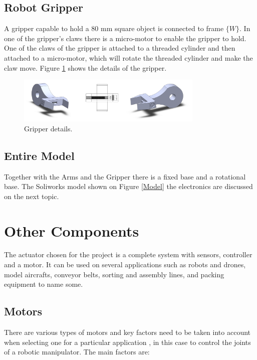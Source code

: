 \documentclass[transmag]{IEEEtran}
\begin{document}
\subsection{Robot Gripper}
A gripper capable to hold a 80 mm square object is connected to frame $\{W\}$.
In one of the gripper's claws there is a micro-motor to enable the gripper to hold.
One of the claws of the gripper is attached to a threaded cylinder and then attached to a micro-motor, which will rotate the threaded cylinder and make the claw move. Figure \ref{Gripper} shows the details of the gripper.

\begin{figure}
\centerline{\includegraphics[width=3.5in]{./images/Gripper}}
\caption{Gripper details.\label{Gripper}}
\end{figure}
 

\subsection{Entire Model}

Together with the Arms and the Gripper there is a fixed base and a rotational base. The Soliworks model shown on Figure \ref{Model} the electronics are discussed on the next topic.




\section{Other Components}
The actuator chosen for the project is a complete system with sensors, controller and a motor. It can be used on several applications such as robots and drones, model aircrafts, conveyor belts, sorting and assembly lines, and packing equipment to name some.


\subsection{Motors}

There are various types of motors and key factors need to be taken into account when selecting one for a particular application \cite{ref3}, in this case to control the joints of a robotic manipulator. The main factors are:
\end{document}
